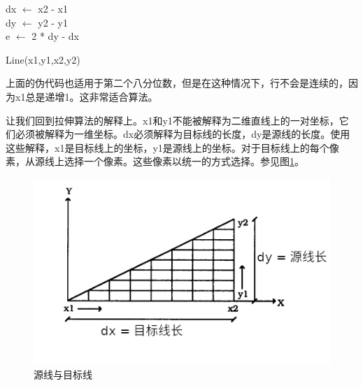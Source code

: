 \begin{CJK}{UTF8}{gbsn}
\begin{algorithm}
	
	 \BlankLine 
	 \BlankLine
	 
	 
	 
	dx $\leftarrow$ x2 - x1\\
	dy $\leftarrow$ y2 - y1\\
	e $\leftarrow$ 2 * dy - dx\\
	 
	 
	 
 	 	  \caption{Line(x1,y1,x2,y2)}
 	 	  \label{algo:Line} 
 	 \end{algorithm}
\DecMargin{1em} 

上面的伪代码也适用于第二个八分位数，但是在这种情况下，行不会是连续的，因为x1总是递增1。这非常适合算法。


让我们回到拉伸算法的解释上。x1和y1不能被解释为二维直线上的一对坐标，它们必须被解释为一维坐标。dx必须解释为目标线的长度，dy是源线的长度。使用这些解释，x1是目标线上的坐标，y1是源线上的坐标。对于目标线上的每个像素，从源线上选择一个像素。这些像素以统一的方式选择。参见图\ref{fig:drawline}。
\begin{figure}[htbp]%
  \centering
  \includegraphics[totalheight=2in]{./fig/1.png}
  \caption{源线与目标线} 
  \label{fig:drawline}
\end{figure}


\end{CJK}
